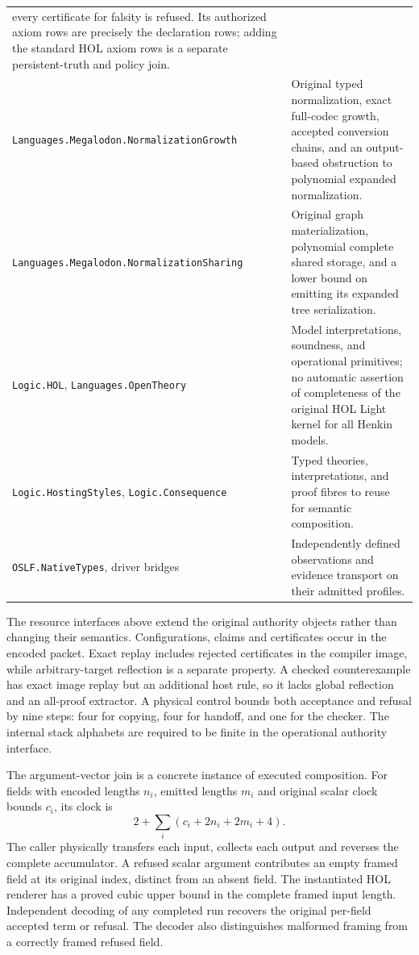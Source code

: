 \documentclass[11pt]{article}
\newcommand{\code}[1]{\nolinkurl{#1}}
\begin{document}
{\begin{longtable}{>{\raggedright\arraybackslash}p{.39\linewidth}>{\raggedright\arraybackslash}p{.55\linewidth}}
  every certificate for falsity is refused. Its authorized axiom rows are
  precisely the declaration rows; adding the standard HOL axiom rows is
  a separate persistent-truth and policy join.\\
\code{Languages.Megalodon.NormalizationGrowth} & Original typed normalization,
  exact full-codec growth, accepted conversion chains, and an output-based
  obstruction to polynomial expanded normalization.\\
\code{Languages.Megalodon.NormalizationSharing} & Original graph
  materialization, polynomial complete shared storage, and a lower bound
  on emitting its expanded tree serialization.\\
\code{Logic.HOL}, \code{Languages.OpenTheory} & Model interpretations,
  soundness, and operational primitives; no automatic assertion of
  completeness of the original HOL Light kernel for all Henkin models.\\
\code{Logic.HostingStyles}, \code{Logic.Consequence} & Typed theories,
  interpretations, and proof fibres to reuse for semantic composition.\\
\code{OSLF.NativeTypes}, driver bridges & Independently defined
  observations and evidence transport on their admitted profiles.\\
\bottomrule
\end{longtable}}

The resource interfaces above extend the original authority objects rather
than changing their semantics. Configurations, claims and certificates occur
in the encoded packet. Exact replay includes rejected certificates in the
compiler image, while arbitrary-target reflection is a separate property.
A checked counterexample has exact image replay but an additional host rule,
so it lacks global reflection and an all-proof extractor. A physical control
bounds both acceptance and refusal by nine steps: four for copying, four
for handoff, and one for the checker. The internal stack alphabets are required to be
finite in the operational authority interface.

The argument-vector join is a concrete instance of executed composition.
For fields with encoded lengths $n_i$, emitted lengths $m_i$ and original
scalar clock bounds $c_i$, its clock is
\[
  2+\sum_i(c_i+2n_i+2m_i+4).
\]
The caller physically transfers each input, collects each output and
reverses the complete accumulator. A refused scalar argument contributes
an empty framed field at its original index, distinct from an absent
field. The instantiated HOL renderer has a proved cubic upper bound in
the complete framed input length. Independent decoding of any completed
run recovers the original per-field accepted term or refusal. The decoder
also distinguishes malformed framing from a correctly framed refused field.
\end{document}
